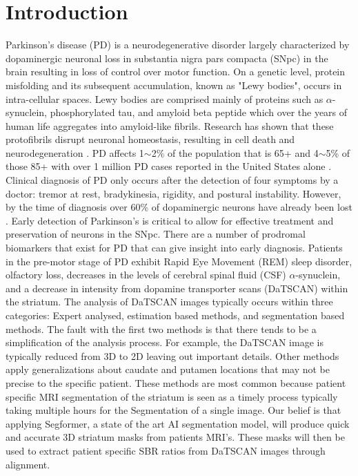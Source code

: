 \section{Introduction}
Parkinson’s disease (PD) is a neurodegenerative disorder largely characterized by dopaminergic neuronal loss in substantia nigra pars compacta (SNpc) in the brain resulting in loss of control over motor function. On a genetic level, protein misfolding and its subsequent accumulation, known as "Lewy bodies", occurs in intra-cellular spaces. Lewy bodies are comprised mainly of proteins such as $\alpha$-synuclein, phosphorylated tau, and amyloid beta peptide which over the years of human life aggregates into amyloid-like fibrils. Research has shown that these protofibrils disrupt neuronal homeostasis, resulting in cell death and neurodegeneration \cite{stefanis}. PD affects 1$\sim$2\% of the population that is 65+ and 4$\sim$5\% of those 85+ with over 1 million PD cases reported in the United States alone \cite{PPMI}. Clinical diagnosis of PD only occurs after the detection of four symptoms by a doctor: tremor at rest, bradykinesia, rigidity, and postural instability. However, by the time of diagnosis over 60\% of dopaminergic neurons have already been lost  \cite{prashanth}. Early detection of Parkinson's is critical to allow for effective treatment and preservation of neurons in the SNpc. There are a number of prodromal biomarkers that exist for PD that can give insight into early diagnosis. Patients in the pre-motor stage of PD exhibit Rapid Eye Movement (REM) sleep disorder, olfactory loss, decreases in the levels of cerebral spinal fluid (CSF) $\alpha$-synuclein, and a decrease in intensity from dopamine transporter scans (DaTSCAN) within the striatum.  The analysis of DaTSCAN images typically occurs within three categories: Expert analysed, estimation based methods, and segmentation based methods. The fault with the first two methods is that there tends to be a simplification of the analysis process. For example, the DaTSCAN image is typically reduced from 3D to 2D leaving out important details. Other methods apply generalizations about caudate and putamen locations that may not be precise to the specific patient. These methods are most common because patient specific MRI segmentation of the striatum is seen as a timely process typically taking multiple hours for the Segmentation of a single image. Our belief is that applying Segformer, a state of the art AI segmentation model, will produce quick and accurate 3D striatum masks from patients MRI's. These masks will then be used to extract patient specific SBR ratios from DaTSCAN images through alignment.
